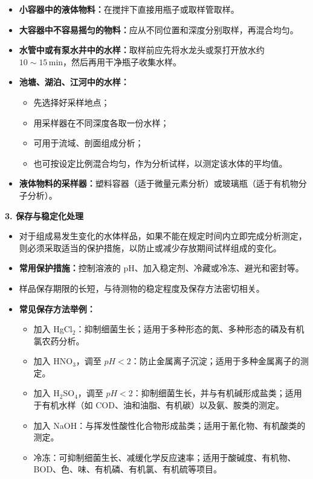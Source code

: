 \documentclass[12pt,a4paper]{article}
\numberwithin{equation}{section}
\begin{document}
\begin{itemize}
    \item \textbf{小容器中的液体物料：}在搅拌下直接用瓶子或取样管取样。
    
    \item \textbf{大容器中不容易摇匀的物料：}应从不同位置和深度分别取样，再混合均匀。
    
    \item \textbf{水管中或有泵水井中的水样：}取样前应先将水龙头或泵打开放水约 $10\sim15\,\mathrm{min}$，然后再用干净瓶子收集水样。
    
    \item \textbf{池塘、湖泊、江河中的水样：}
    \begin{itemize}
        \item 先选择好采样地点；
        \item 用采样器在不同深度各取一份水样；
        \item 可用于流域、剖面组成分析；
        \item 也可按设定比例混合均匀，作为分析试样，以测定该水体的平均值。
    \end{itemize}
    
    \item \textbf{液体物料的采样器：}塑料容器（适于微量元素分析）或玻璃瓶（适于有机物分子分析）。
\end{itemize}

\bf{3. 保存与稳定化处理}

\begin{itemize}
    \item 对于组成易发生变化的水体样品，如果不能在规定时间内立即完成分析测定，则必须采取适当的保护措施，以防止或减少存放期间试样组成的变化。
    
    \item \textbf{常用保护措施：}控制溶液的 pH、加入稳定剂、冷藏或冷冻、避光和密封等。
    
    \item 样品保存期限的长短，与待测物的稳定程度及保存方法密切相关。
    
    \item \textbf{常见保存方法举例：}
    \begin{itemize}
        \item 加入 HgCl$_2$：抑制细菌生长；适用于多种形态的氮、多种形态的磷及有机氯农药分析。
        
        \item 加入 HNO$_3$，调至 $pH<2$：防止金属离子沉淀；适用于多种金属离子的测定。
        
        \item 加入 H$_2$SO$_4$，调至 $pH<2$：抑制细菌生长，并与有机碱形成盐类；适用于有机水样（如 COD、油和油脂、有机碳）以及氨、胺类的测定。
        
        \item 加入 NaOH：与挥发性酸性化合物形成盐类；适用于氰化物、有机酸类的测定。
        
        \item 冷冻：可抑制细菌生长、减缓化学反应速率；适用于酸碱度、有机物、BOD、色、味、有机磷、有机氯、有机硫等项目。
    \end{itemize}
\end{itemize}
\end{document}
